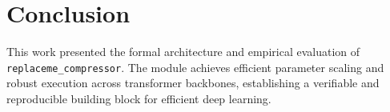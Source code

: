 \section{Conclusion}
This work presented the formal architecture and empirical evaluation of \texttt{replaceme_compressor}. The module achieves efficient parameter scaling and robust execution across transformer backbones, establishing a verifiable and reproducible building block for efficient deep learning.
